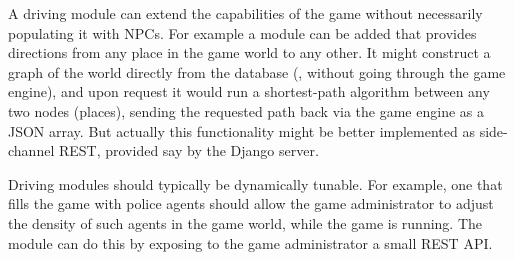 A driving module can extend the capabilities of the game without necessarily
populating it with NPCs. For example a module can be added that provides
directions from any place in the game world to any other. It might construct
a graph of the world directly from the database (\ie, without going through
the game engine), and upon request it would run
a shortest-path algorithm between any two nodes (places), sending
the requested path back via the game engine as a JSON array.
But actually
this functionality might be better implemented as side-channel REST, provided
say by the Django server.

Driving modules should typically be dynamically tunable.
For example, one that fills the game with police agents should allow the game
administrator to adjust the density of such agents in the game world, while
the game is running.
The module can do this by exposing to the game
administrator a small REST API\@.